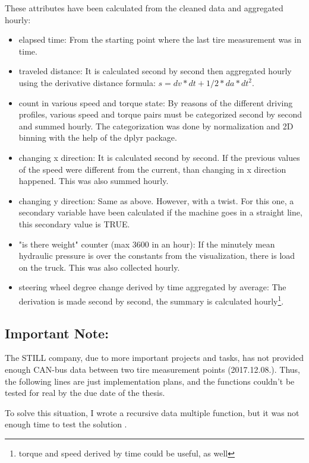 These attributes have been calculated from the cleaned data and aggregated hourly:
	\begin{itemize}
		\item{elapsed time:} From the starting point where the last tire measurement was in time.
		\item{traveled distance:} It is calculated second by second then aggregated hourly using the derivative distance formula: $s = dv*dt + 1/2*da*dt^2$.
		\item{count in various speed and torque state:} By reasons of the different driving profiles, various speed and torque pairs must be categorized second by second and summed hourly. The categorization was done by normalization and 2D binning with the help of the dplyr package.
		\item{changing x direction:} It is calculated second by second. If the previous values of the speed were different from the current, than changing in x direction happened. This was also summed hourly.
		\item{changing y direction:} Same as above. However, with a twist. For this one, a secondary variable have been calculated if the machine goes in a straight line, this secondary value is TRUE.
		\item{"is there weight" counter (max 3600 in an hour):} If the minutely mean hydraulic pressure is over the constants from the visualization, there is load on the truck. This was also collected hourly.
		\item{steering wheel degree change derived by time aggregated by average:} The derivation is made second by second, the summary is calculated hourly\footnote{torque and speed derived by time could be useful, as well}.
	\end{itemize}
\subsection{Important Note:}
			The STILL company, due to more important projects and tasks, has not provided enough CAN-bus data between two tire measurement points (2017.12.08.). Thus, the following lines are just implementation plans, and the functions couldn't be tested for real by the due date of the thesis.

			To solve this situation, I wrote a recursive data multiple function, but it was not enough time to test the solution \cite{rekur}.

